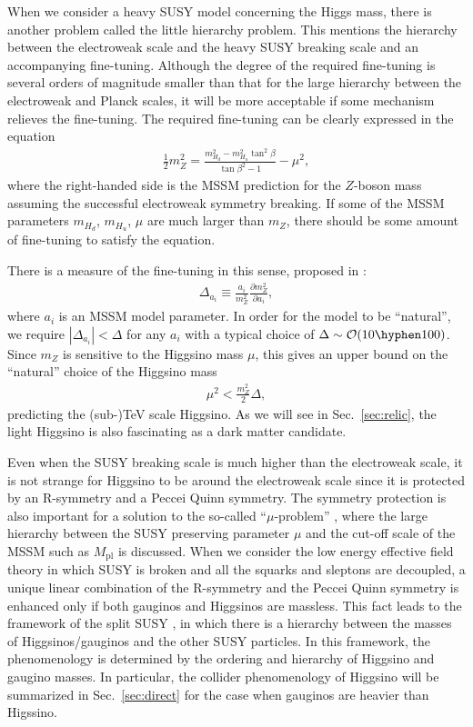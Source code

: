 \documentclass[12pt,twoside,book]{article}
\begin{document}
When we consider a heavy SUSY model concerning the Higgs mass, there is another problem called the little hierarchy problem.
This mentions the hierarchy between the electroweak scale and the heavy SUSY breaking scale and an accompanying fine-tuning.
Although the degree of the required fine-tuning is several orders of magnitude smaller than that for the large hierarchy between the electroweak and Planck scales, it will be more acceptable if some mechanism relieves the fine-tuning.
The required fine-tuning can be clearly expressed in the equation
\begin{align}
  \frac{1}{2} m_Z^2 = \frac{m_{H_d}^2 - m_{H_u}^2 \tan^2 \beta}{\tan \beta^2 - 1} - \mu^2,
\end{align}
where the right-handed side is the MSSM prediction for the $Z$-boson mass assuming the successful electroweak symmetry breaking.
If some of the MSSM parameters $m_{H_d}$, $m_{H_u}$, $\mu$ are much larger than $m_Z$, there should be some amount of fine-tuning to satisfy the equation.

There is a measure of the fine-tuning in this sense, proposed in \cite{Ellis:1986yg,Barbieri:1987fn}:
\begin{align}
  \Delta_{a_i} \equiv \frac{a_i}{m_Z^2} \frac{\partial m_Z^2}{\partial a_i},
\end{align}
where $a_i$ is an MSSM model parameter.
In order for the model to be ``natural'', we require $|\Delta_{a_i}| < \Delta$ for any $a_i$ with a typical choice of $\Delta \sim \mathcal{O}(10 \hyphen 100)$.
Since $m_Z$ is sensitive to the Higgsino mass $\mu$, this gives an upper bound on the ``natural'' choice of the Higgsino mass
\begin{align}
  \mu^2 < \frac{m_Z^2}{2} \Delta,
\end{align}
predicting the (sub-)TeV scale Higgsino.
As we will see in Sec.~\ref{sec:relic}, the light Higgsino is also fascinating as a dark matter candidate.

Even when the SUSY breaking scale is much higher than the electroweak scale, it is not strange for Higgsino to be around the electroweak scale since it is protected by an R-symmetry and a Peccei Quinn symmetry.
The symmetry protection is also important for a solution to the so-called ``$\mu$-problem'' \cite{Giudice:1988yz}, where the large hierarchy between the SUSY preserving parameter $\mu$ and the cut-off scale of the MSSM such as $M_{\mathrm{pl}}$ is discussed.
When we consider the low energy effective field theory in which SUSY is broken and all the squarks and sleptons are decoupled, a unique linear combination of the R-symmetry and the Peccei Quinn symmetry is enhanced only if both gauginos and Higgsinos are massless.
This fact leads to the framework of the split SUSY \cite{Giudice:2004tc}, in which there is a hierarchy between the masses of Higgsinos/gauginos and the other SUSY particles.
In this framework, the phenomenology is determined by the ordering and hierarchy of Higgsino and gaugino masses.
In particular, the collider phenomenology of Higgsino will be summarized in Sec.~\ref{sec:direct} for the case when gauginos are heavier than Higssino.
\end{document}
